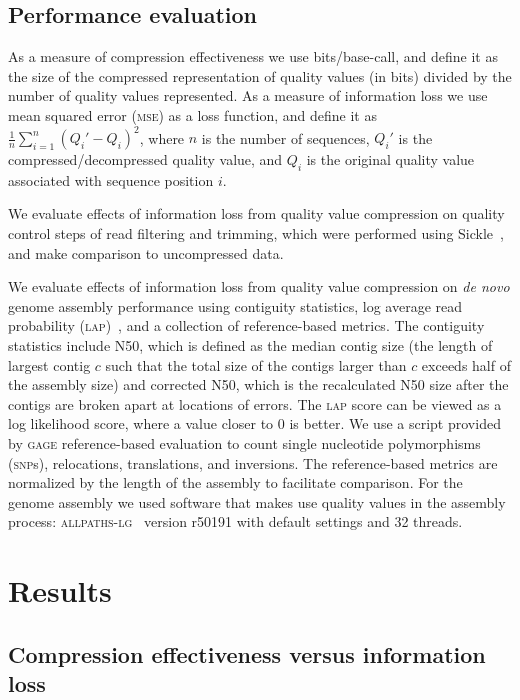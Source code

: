 \subsection{Performance evaluation}

As a measure of compression effectiveness we use bits/base-call, and
define it as the size of the compressed representation of quality
values (in bits) divided by the number of quality values represented.
As a measure of information loss we use mean squared error
(\textsc{mse}) as a loss function, and define it as
$\frac{1}{n}\sum_{i=1}^{n}{(Q_i'-Q_i)^2}$, where $n$ is the number of
sequences, $Q_i'$ is the compressed/decompressed quality value, and
$Q_i$ is the original quality value associated with sequence position
$i$.

We evaluate effects of information loss from quality value compression
on quality control steps of read filtering and trimming, which were
performed using Sickle~\cite{sickle}, and make comparison to
uncompressed data.

We evaluate effects of information loss from quality value compression
on \emph{de novo} genome assembly performance using contiguity
statistics, log average read probability
(\textsc{lap})~\cite{Ghodsi:2013hb}, and a collection of
reference-based metrics. The contiguity statistics include N50, which is defined as the median contig
size (the length of largest contig $c$ such that the total size of the
contigs larger than $c$ exceeds half of the assembly size) and corrected N50, which is the recalculated N50 size after the contigs are broken apart at locations of errors. The
\textsc{lap} score can be viewed as a log likelihood score, where a
value closer to 0 is better. We use a script provided by \textsc{gage}
reference-based evaluation to count single nucleotide polymorphisms
(\textsc{snp}s), relocations, translations, and inversions. The
reference-based metrics are normalized by the length of the assembly
to facilitate comparison. For the genome assembly we used software
that makes use quality values in the assembly process:
\textsc{allpaths-lg}~\cite{Gnerre:2011kx} version r50191 with default
settings and 32 threads.

\section{Results}

\subsection{Compression effectiveness versus information loss}

